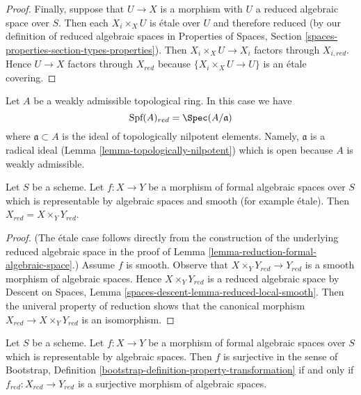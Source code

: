 \begin{proof}
\medskip\noindent
Finally, suppose that $U \to X$ is a morphism with
$U$ a reduced algebraic space over $S$. Then each $X_i \times_X U$
is \'etale over $U$ and therefore reduced (by our definition of
reduced algebraic spaces in Properties of Spaces, Section
\ref{spaces-properties-section-types-properties}).
Then $X_i \times_X U \to X_i$ factors through $X_{i, red}$.
Hence $U \to X$ factors through $X_{red}$ because
$\{X_i \times_X U \to U\}$ is an \'etale covering.
\end{proof}

\begin{example}
\label{example-reduction-affine-formal-spectrum}
Let $A$ be a weakly admissible topological ring. In this case we have
$$
\text{Spf}(A)_{red} = \Spec(A/\mathfrak a)
$$
where $\mathfrak a \subset A$ is the ideal of topologically nilpotent
elements. Namely, $\mathfrak a$ is a radical ideal
(Lemma \ref{lemma-topologically-nilpotent})
which is open because $A$ is weakly admissible.
\end{example}

\begin{lemma}
\label{lemma-reduction-smooth}
Let $S$ be a scheme. Let $f : X \to Y$ be a morphism of
formal algebraic spaces over $S$ which is representable by
algebraic spaces and smooth (for example \'etale).
Then $X_{red} = X \times_Y Y_{red}$.
\end{lemma}

\begin{proof}
(The \'etale case follows directly from the construction of
the underlying reduced algebraic space in the proof of
Lemma \ref{lemma-reduction-formal-algebraic-space}.)
Assume $f$ is smooth. Observe that $X \times_Y Y_{red} \to Y_{red}$
is a smooth morphism of algebraic spaces. Hence $X \times_Y Y_{red}$
is a reduced algebraic space by Descent on Spaces, Lemma
\ref{spaces-descent-lemma-reduced-local-smooth}.
Then the univeral property of reduction shows that the canonical morphism
$X_{red} \to X \times_Y Y_{red}$ is an isomorphism.
\end{proof}

\begin{lemma}
\label{lemma-reduction-surjective}
Let $S$ be a scheme. Let $f : X \to Y$ be a morphism of
formal algebraic spaces over $S$ which is representable by
algebraic spaces. Then $f$ is surjective in the sense of
Bootstrap, Definition \ref{bootstrap-definition-property-transformation}
if and only if $f_{red} : X_{red} \to Y_{red}$ is a
surjective morphism of algebraic spaces.
\end{lemma}

